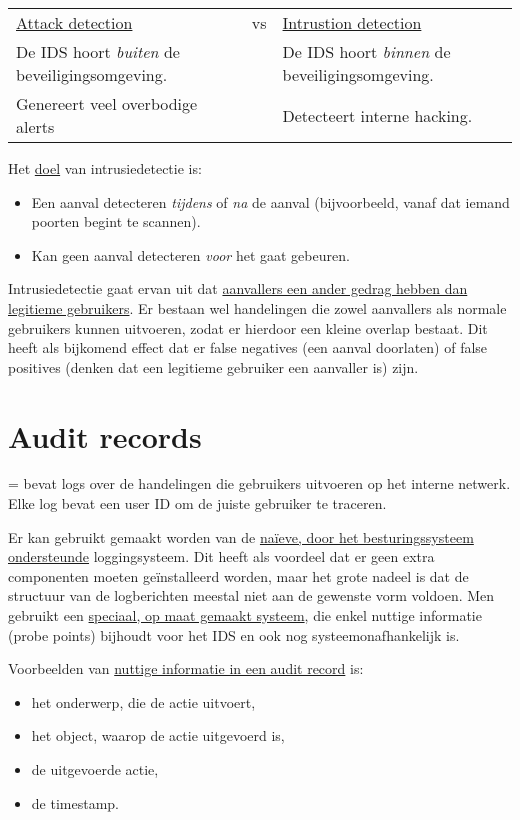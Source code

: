 \documentclass{report}
\begin{document}
	\begin{table}[ht]
		\begin{tabular}{l c l}
			\underline{Attack detection} & vs & \underline{Intrustion detection} \\
			De IDS hoort \emph{buiten} de beveiligingsomgeving. & & De IDS hoort \emph{binnen} de beveiligingsomgeving. \\
			Genereert veel overbodige alerts & & Detecteert interne hacking.
		\end{tabular}
	\end{table}

	Het \underline{doel} van intrusiedetectie is:
	\begin{itemize}
		\item Een aanval detecteren \emph{tijdens} of \emph{na} de aanval (bijvoorbeeld, vanaf dat iemand poorten begint te scannen).
		\item Kan geen aanval detecteren \emph{voor} het gaat gebeuren.
	\end{itemize}

	Intrusiedetectie gaat ervan uit dat \underline{aanvallers een ander gedrag hebben dan legitieme gebruikers}. Er bestaan wel handelingen die zowel aanvallers als normale gebruikers kunnen uitvoeren, zodat er hierdoor een kleine overlap bestaat. Dit heeft als bijkomend effect dat er false negatives (een aanval doorlaten) of false positives (denken dat een legitieme gebruiker een aanvaller is) zijn.

	\section{Audit records}
	= bevat logs over de handelingen die gebruikers uitvoeren op het interne netwerk. Elke log bevat een user ID om de juiste gebruiker te traceren.

	Er kan gebruikt gemaakt worden van de \underline{naïeve, door het besturingssysteem ondersteunde} loggingsysteem. Dit heeft als voordeel dat er geen extra componenten moeten geïnstalleerd worden, maar het grote nadeel is dat de structuur van de logberichten meestal niet aan de gewenste vorm voldoen. Men gebruikt een \underline{speciaal, op maat gemaakt systeem}, die enkel nuttige informatie (probe points) bijhoudt voor het IDS en ook nog systeemonafhankelijk is. 

	Voorbeelden van \underline{nuttige informatie in een audit record} is:
	\begin{itemize}
		\item het onderwerp, die de actie uitvoert,
		\item het object, waarop de actie uitgevoerd is,
		\item de uitgevoerde actie,
		\item de timestamp.
	\end{itemize}
\end{document}
